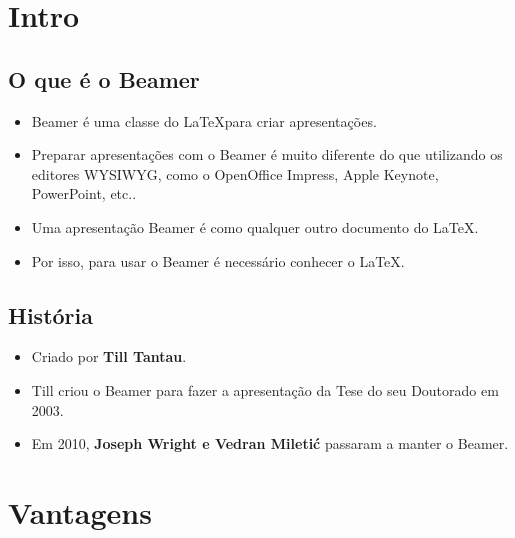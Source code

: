 \section{Intro}

\subsection{O que é o Beamer}

\begin{frame}

  \begin{itemize}[<+->]
     \item Beamer é uma classe do \LaTeX para criar apresentações.
     \item Preparar apresentações com o Beamer é muito diferente do que utilizando
           os editores WYSIWYG, como o OpenOffice Impress, Apple Keynote, PowerPoint, etc..
     \item Uma apresentação Beamer é como qualquer outro documento do \LaTeX.
     \item Por isso, para usar o Beamer é necessário conhecer o \LaTeX.
  \end{itemize}

\end{frame}


\subsection{História}

\begin{frame}
   \begin{itemize}[<+->]
      \item Criado por \textbf{Till Tantau}.
      \item Till criou o Beamer para fazer a apresentação da Tese do seu Doutorado em 2003.
      \item Em 2010, \textbf{Joseph Wright e Vedran Miletić} passaram a manter o Beamer.
   \end{itemize}
\end{frame}

\section{Vantagens}
